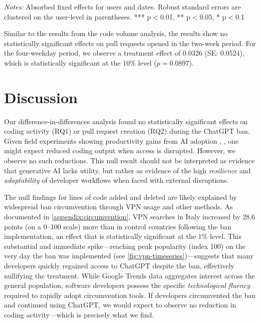 \begin{table}[htbp]
  \centering
  \caption{Difference-in-Differences Results: Pull Requests Opened}
  \label{tab:did-prs-opened}
  
  \par\vspace{0.1cm}
  \textit{Notes:} Absorbed fixed effects for users and dates. Robust standard errors are clustered on the user-level in parentheses. *** p$<$0.01, ** p$<$0.05, * p$<$0.1
\end{table}

Similar to the results from the code volume analysis, the results show no statistically significant effects on pull requests opened in the two-week period. For the four-weekday period, we observe a treatment effect of 0.0326 (SE: 0.0524), which is statistically significant at the 10\% level ($p = 0.0897$).


\section{Discussion}

Our difference-in-differences analysis found no statistically significant effects on coding activity (RQ1) or pull request creation (RQ2) during the ChatGPT ban. Given field experiments showing productivity gains from AI adoption \cite[p.~5]{peng2023impactaideveloperproductivity}, \cite[p.~12]{cui2025the}, one might expect reduced coding output when access is disrupted. However, we observe no such reductions. This null result should not be interpreted as evidence that generative AI lacks utility, but rather as evidence of the high \textit{resilience} and \textit{adaptability} of developer workflows when faced with external disruptions.

The null findings for lines of code added and deleted are likely explained by widespread ban circumvention through VPN usage and other methods. As documented in \autoref{appendix:circumvention}, VPN searches in Italy increased by 28.6 points (on a 0--100 scale) more than in control countries following the ban implementation, an effect that is statistically significant at the 1\% level. This substantial and immediate spike---reaching peak popularity (index 100) on the very day the ban was implemented (see \autoref{fig:vpn-timeseries})---suggests that many developers quickly regained access to ChatGPT despite the ban, effectively nullifying the treatment. While Google Trends data aggregates interest across the general population, software developers possess the specific \textit{technological fluency} required to rapidly adopt circumvention tools. If developers circumvented the ban and continued using ChatGPT, we would expect to observe no reduction in coding activity---which is precisely what we find.

